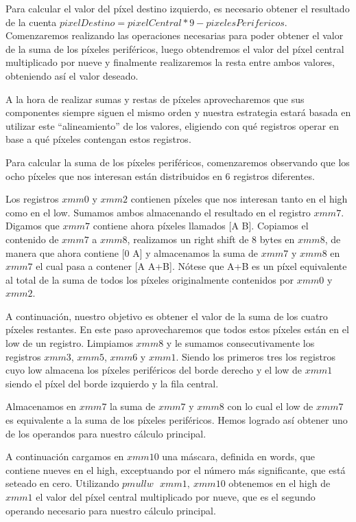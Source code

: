 Para calcular el valor del píxel destino izquierdo, es necesario obtener el resultado de la cuenta $pixelDestino = pixelCentral * 9 - pixelesPerifericos$.
Comenzaremos realizando las operaciones necesarias para poder obtener el valor de la suma de los píxeles periféricos, luego obtendremos el valor del píxel central multiplicado por nueve y finalmente realizaremos la resta entre ambos valores, obteniendo así el valor deseado.

A la hora de realizar sumas y restas de píxeles aprovecharemos que sus componentes siempre siguen el mismo orden y nuestra estrategia estará basada en utilizar este “alineamiento” de los valores, eligiendo con qué registros operar en base a qué píxeles contengan estos registros.

Para calcular la suma de los píxeles periféricos, comenzaremos observando que los ocho píxeles que nos interesan están distribuidos en 6 registros diferentes. 

Los registros $xmm0$ y $xmm2$ contienen píxeles que nos interesan tanto en el high como en el low. Sumamos ambos almacenando el resultado en el registro $xmm7$. Digamos que $xmm7$ contiene ahora píxeles llamados [A  B]. Copiamos el contenido de $xmm7$ a $xmm8$, realizamos un right shift de 8 bytes en $xmm8$, de manera que ahora contiene [0 A] y almacenamos la suma de $xmm7$ y $xmm8$ en $xmm7$ el cual pasa a contener [A A+B]. Nótese que A+B es un píxel equivalente al total de la suma de todos los píxeles originalmente contenidos por $xmm0$ y $xmm2$.

A continuación, nuestro objetivo es obtener el valor de la suma de los cuatro píxeles restantes. En este paso aprovecharemos que todos estos píxeles están en el low de un registro. Limpiamos $xmm8$ y le sumamos consecutivamente los registros $xmm3$, $xmm5$, $xmm6$ y $xmm1$. Siendo los primeros tres los registros cuyo low almacena los píxeles periféricos del borde derecho y el low de $xmm1$ siendo el píxel del borde izquierdo y la fila central.

Almacenamos en $xmm7$ la suma de $xmm7$ y $xmm8$ con lo cual el low de $xmm7$ es equivalente a la suma de los píxeles periféricos. Hemos logrado así obtener uno de los operandos para nuestro cálculo principal.

A continuación cargamos en $xmm10$ una máscara, definida en words, que contiene nueves en el high, exceptuando por el número más significante, que está seteado en cero. Utilizando $pmullw \ \ \ xmm1, \ xmm10$ obtenemos en el high de $xmm1$ el valor del píxel central multiplicado por nueve, que es el segundo operando necesario para nuestro cálculo principal.

